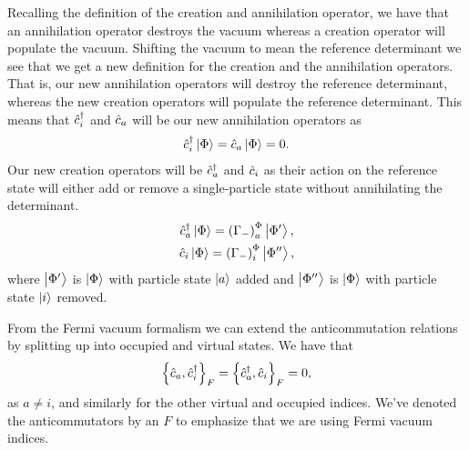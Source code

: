             Recalling the definition of the creation and annihilation operator,
            we have that an annihilation operator destroys the vacuum whereas a
            creation operator will populate the vacuum.
            Shifting the vacuum to mean the reference determinant we see that we
            get a new definition for the creation and the annihilation
            operators.
            That is, our new annihilation operators will destroy the reference
            determinant, whereas the new creation operators will populate the
            reference determinant.
            This means that $\hat{c}_{i}^{\dagger}$ and $\hat{c}_{a}$ will be our new annihilation
            operators as
            \begin{align}
                \hat{c}_{i}^{\dagger}\ket{\Phi} = \hat{c}_{a}\ket{\Phi} = 0.
            \end{align}
            Our new creation operators will be $\hat{c}_{a}^{\dagger}$ and $\hat{c}_{i}$ as their
            action on the reference state will either add or remove a
            single-particle state without annihilating the determinant.
            \begin{gather}
                \hat{c}_{a}^{\dagger}\ket{\Phi}
                = \left( \Gamma_{-} \right)^{\Phi}_{a}\ket{\Phi'},
                \\
                \hat{c}_{i}\ket{\Phi}
                = \left( \Gamma_{-} \right)^{\Phi}_{i}\ket{\Phi''},
            \end{gather}
            where $\ket{\Phi'}$ is $\ket{\Phi}$ with particle state $\ket{a}$
            added and $\ket{\Phi''}$ is $\ket{\Phi}$ with particle state
            $\ket{i}$ removed.

            From the Fermi vacuum formalism we can extend the anticommutation
            relations by splitting up into occupied and virtual states.
            We have that
            \begin{align}
                \left\{\hat{c}_{a}, \hat{c}_{i}^{\dagger}\right\}_F
                = \left\{\hat{c}_{a}^{\dagger}, \hat{c}_{i}\right\}_F
                = 0,
                \label{eq:fermi-anticommutation-zero}
            \end{align}
            as $a \neq i$, and similarly for the other virtual and occupied
            indices.
            We've denoted the anticommutators by an $F$ to emphasize that we
            are using Fermi vacuum indices.

